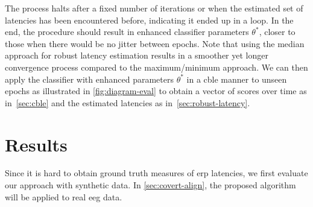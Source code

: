 The process halts after a fixed number of iterations or when the estimated set
of latencies has been encountered before, indicating it ended up in a loop.
In the end, the procedure should result in enhanced classifier parameters $\theta^*$,
closer to those when there would be no jitter between epochs.
Note that using the median approach for robust latency estimation results in a
smoother yet longer convergence process compared to the maximum/minimum approach.
We can then apply the classifier with enhanced parameters $\theta^*$ in a \ac{cble}
manner to unseen epochs as illustrated in \cref{fig:diagram-eval} to obtain a
vector of scores over time as in~\cref{sec:cble} and the estimated latencies as
in~\cref{sec:robust-latency}.
\section{Results}
\label{sec:wcble/results}
Since it is hard to obtain ground truth measures of \ac{erp} latencies, we
first evaluate our approach with synthetic data.
In \cref{sec:covert-align}, the proposed algorithm will be applied to real
\ac{eeg} data.

